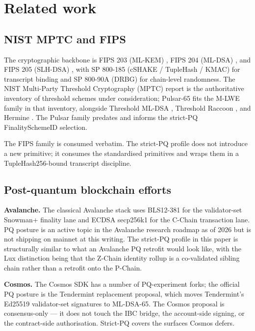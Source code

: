 \section{Related work}
\label{sec:related-work}

\subsection{NIST MPTC and FIPS}

The cryptographic backbone is FIPS 203 (ML-KEM) \cite{fips203}, FIPS 204
(ML-DSA) \cite{fips204}, and FIPS 205 (SLH-DSA) \cite{fips205}, with SP
800-185 (cSHAKE / TupleHash / KMAC) \cite{sp800185} for transcript binding
and SP 800-90A (DRBG) \cite{sp80090a} for chain-level randomness. The
NIST Multi-Party Threshold Cryptography (MPTC) report
\cite{nistir8214c} is the authoritative inventory of threshold schemes
under consideration; Pulsar-65 fits the M-LWE family in that inventory,
alongside Threshold ML-DSA \cite{tmldsa2025}, Threshold Raccoon
\cite{thresholdraccoon}, and Hermine \cite{hermine}. The Pulsar family
\cite{lp073} predates and informs the strict-PQ FinalitySchemeID
selection.

The FIPS family is consumed verbatim. The strict-PQ profile does not
introduce a new primitive; it consumes the standardised primitives and
wraps them in a TupleHash256-bound transcript discipline.

\subsection{Post-quantum blockchain efforts}

\textbf{Avalanche.} The classical Avalanche stack uses BLS12-381 for the
validator-set Snowman+ finality lane and ECDSA secp256k1 for the C-Chain
transaction lane. PQ posture is an active topic in the Avalanche research
roadmap as of 2026 but is not shipping on mainnet at this writing. The
strict-PQ profile in this paper is structurally similar to what an
Avalanche PQ retrofit would look like, with the Lux distinction being that
the Z-Chain identity rollup is a co-validated sibling chain rather than a
retrofit onto the P-Chain.

\textbf{Cosmos.} The Cosmos SDK has a number of PQ-experiment forks; the
official PQ posture is the Tendermint replacement proposal, which moves
Tendermint's Ed25519 validator-set signatures to ML-DSA-65. The Cosmos
proposal is consensus-only --- it does not touch the IBC bridge, the
account-side signing, or the contract-side authorisation. Strict-PQ
covers the surfaces Cosmos defers.

